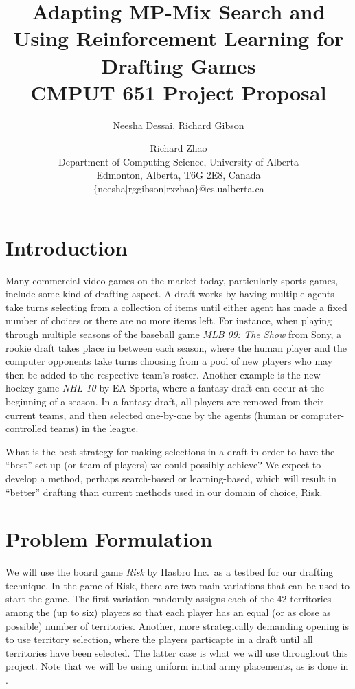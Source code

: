 \documentclass[letterpaper]{article}
\title{Adapting MP-Mix Search and Using Reinforcement Learning for Drafting Games  \\ \small \vspace{0.1cm} CMPUT 651 Project Proposal}
\author{Neesha Dessai, Richard Gibson \and Richard Zhao \\
Department of Computing Science, University of Alberta \\
Edmonton, Alberta, T6G 2E8, Canada \\
$\{$neesha$\mid$rggibson$\mid$rxzhao$\}$@cs.ualberta.ca}
\numberwithin{equation}{section}
\numberwithin{theorem}{section}
\numberwithin{lemma}{section}
\numberwithin{df}{section}
\begin{document}
\maketitle


\section{Introduction}

Many commercial video games on the market today, particularly sports games, include some kind of drafting aspect.  A draft works by having multiple agents take turns selecting from a collection of items until either agent has made a fixed number of choices or there are no more items left.  For instance, when playing through multiple seasons of the baseball game \textit{MLB 09: The Show} from Sony, a rookie draft takes place in between each season, where the human player and the computer opponents take turns choosing from a pool of new players who may then be added to the respective team's roster.  Another example is the new hockey game \textit{NHL 10} by EA Sports, where a fantasy draft can occur at the beginning of a season.  In a fantasy draft, all players are removed from their current teams, and then selected one-by-one by the agents (human or computer-controlled teams) in the league.  

What is the best strategy for making selections in a draft in order to have the ``best'' set-up (or team of players) we could possibly achieve?  We expect to develop a method, perhaps search-based or learning-based, which will result in ``better'' drafting than current methods used in our domain of choice, Risk.

\section{Problem Formulation}
\label{sec:Prob}

We will use the board game \textit{Risk} by Hasbro Inc.~as a testbed for our drafting technique.  In the game of Risk, there are two main variations that can be used to start the game.  The first variation randomly assigns each of the 42 territories among the (up to six) players so that each player has an equal (or as close as possible) number of territories.  Another, more strategically demanding opening is to use territory selection, where the players particapte in a draft until all territories have been selected.  The latter case is what we will use throughout this project.  Note that we will be using uniform initial army placements, as is done in \cite{ZuckFelnerKraus2009}.
\end{document}
